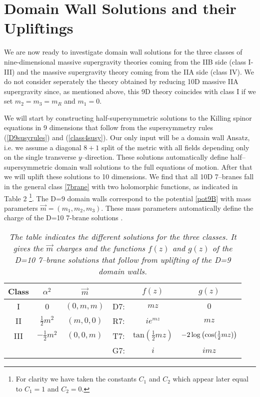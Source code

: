 \documentclass[12pt,a4paper]{article}
\begin{document}
\section{Domain Wall Solutions and their Upliftings}

We are now ready to investigate domain wall solutions for the
three classes of nine-dimensional massive supergravity theories
coming from the IIB side (class I-III) and the massive supergravity
theory coming from the IIA side (class IV). We do not consider
seperately the theory obtained by reducing 10D massive IIA
supergravity since, as mentioned above, this 9D theory coincides
with class I if we set $m_2=m_3=m_R$ and $m_1=0$.

We will start by constructing half-supersymmetric solutions
to the Killing spinor equations in 9 dimensions that follow from
the supersymmetry rules (\ref{D9susyrules}) and (\ref{class4susy}).
Our only input will be a domain wall Ansatz, i.e. we assume a
diagonal $8+1$ split of the metric with all fields depending only
on the single transverse $y$--direction. These solutions
automatically define half--supersymmetric domain wall solutions to
the full equations of motion. After that we will uplift these
solutions to 10 dimensions. We find that all 10D 7--branes fall in
the general class \eqref{7brane} with two holomorphic functions,
as indicated in Table 2 \footnote{
  For clarity we have taken the constants $C_1$ and $C_2$ which
appear later equal to $C_1=1$ and $C_2=0$.}. The D=9 domain walls correspond to the
potential \eqref{pot9B} with mass parameters
$\vec{m}=(m_1,m_2,m_3)$. These mass parameters automatically
define the charge of the D=10 7-brane solutions
\cite{Meessen:1998qm}.


\begin{table}[ht]
\begin{center}
\begin{tabular}{||c|c|c|c|c|c||}
\hline \rule[-1mm]{0mm}{6mm}
  Class & $\alpha^2$ & $\vec{m}$ & & $f(z)$ & $g(z)$ \\
\hline \hline \rule[-1mm]{0mm}{6mm}
  I & 0 & $(0,m,m)$ & D7: & $mz$ & $0$ \\
\hline \rule[-1mm]{0mm}{6mm}
  II & $\tfrac{1}{2} m^2$ & $(m,0,0)$ & R7: & $i e^{mz}$ & $m z$ \\
\hline \rule[-1mm]{0mm}{6mm}
  III & $-\tfrac{1}{2} m^2$ & $(0,0,m)$ & T7: & $\text{tan}(\tfrac{1}{2}mz)$
    & $-2\log\left(\cos({1\over 2}mz)\right)$ \\
  & & & G7: & $i$ & $i m z$ \\
\hline
\end{tabular}
\caption{\it The table indicates the different solutions for the three classes.
  It gives the $\vec{m}$ charges and the functions $f(z)$ and $g(z)$ of
  the D=10 7--brane solutions that follow from uplifting of the D=9
domain walls.}
\end{center}
\end{table}
\end{document}
